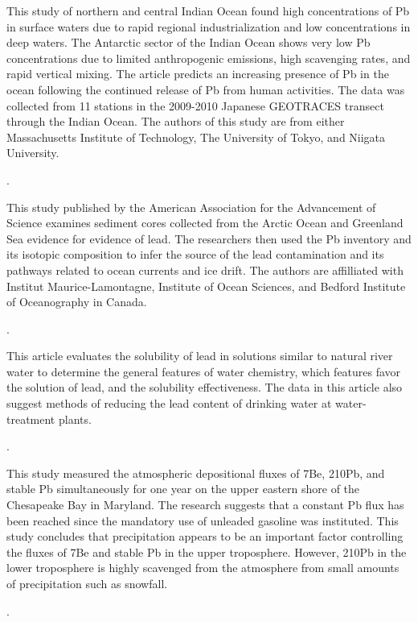 \documentclass{article}
\begin{document}
This study of northern and central Indian Ocean found high concentrations of Pb in surface waters due to rapid regional industrialization and low concentrations in deep waters. The Antarctic sector of the Indian Ocean shows very low Pb concentrations due to limited anthropogenic emissions, high scavenging rates, and rapid vertical mixing. The article predicts an increasing presence of Pb in the ocean following the continued release of Pb from human activities. The data was collected from 11 stations in the 2009-2010 Japanese GEOTRACES transect through the Indian Ocean. The authors of this study are from either Massachusetts Institute of Technology, The University of Tokyo, and Niigata University. 

\medskip
\noindent {}.
\medskip

This study published by the American Association for the Advancement of Science examines sediment cores collected from the Arctic Ocean and Greenland Sea evidence for evidence of lead. The researchers then used the Pb inventory and its isotopic composition to infer the source of the lead contamination and its pathways related to ocean currents and ice drift. The authors are affilliated with Institut Maurice-Lamontagne, Institute of Ocean Sciences, and Bedford Institute of Oceanography in Canada.

\medskip
\noindent {}.
\bigskip

This article evaluates the solubility of lead in solutions similar to natural river water to determine the general features of water chemistry, which features favor the solution of lead, and the solubility effectiveness. The data in this article also suggest methods of reducing the lead content of drinking water at water-treatment plants. 

\medskip
\noindent {}.
\medskip

This study measured the atmospheric depositional fluxes of 7Be, 210Pb, and stable Pb simultaneously for one year on the upper eastern shore of the Chesapeake Bay in Maryland. The research suggests that a constant Pb flux has been reached since the mandatory use of unleaded gasoline was instituted. This study concludes that precipitation appears to be an important factor controlling the fluxes of 7Be and stable Pb in the upper troposphere. However, 210Pb in the lower troposphere is highly scavenged from the atmosphere from small amounts of precipitation such as snowfall. 

\medskip
\noindent {}.
\medskip
\end{document}
